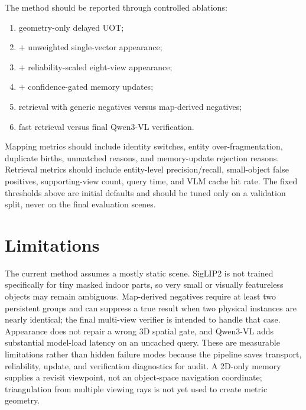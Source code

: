 \documentclass[11pt]{article}
\newcommand{\1}{\bm{1}}
\begin{document}
The method should be reported through controlled ablations:
\begin{enumerate}[leftmargin=*]
    \item geometry-only delayed UOT;
    \item $+$ unweighted single-vector appearance;
    \item $+$ reliability-scaled eight-view appearance;
    \item $+$ confidence-gated memory updates;
    \item retrieval with generic negatives versus map-derived negatives;
    \item fast retrieval versus final Qwen3-VL verification.
\end{enumerate}
Mapping metrics should include identity switches, entity over-fragmentation,
duplicate births, unmatched reasons, and memory-update rejection reasons.
Retrieval metrics should include entity-level precision/recall, small-object false
positives, supporting-view count, query time, and VLM cache hit rate. The fixed
thresholds above are initial defaults and should be tuned only on a validation
split, never on the final evaluation scenes.

\section{Limitations}

The current method assumes a mostly static scene. SigLIP2 is not trained
specifically for tiny masked indoor
parts, so very small or visually featureless objects may remain ambiguous.
Map-derived negatives require at least two persistent groups and can suppress a
true result when two physical instances are nearly identical; the final
multi-view verifier is intended to handle that case. Appearance does not repair
a wrong 3D spatial gate, and Qwen3-VL adds substantial model-load latency on an
uncached query. These are measurable limitations rather than hidden failure
modes because the pipeline saves transport, reliability, update, and verification
diagnostics for audit. A 2D-only memory supplies a revisit viewpoint, not an
object-space navigation coordinate; triangulation from multiple viewing rays is
not yet used to create metric geometry.
\end{document}
